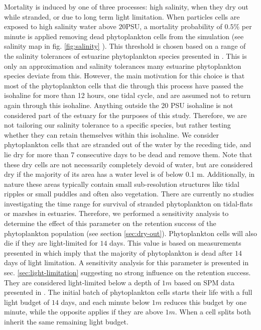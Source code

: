 \documentclass[npg, manuscript]{copernicus}
\begin{document}
Mortality is induced by one of three processes: high salinity, when they dry out while stranded, or due to long term light limitation.
When particles cells are exposed to high salinity water above $20$PSU, a mortality probability of $0.5\%$ per minute is applied removing dead phytoplankton cells from the simulation (see salinity map in fig. \ref{fig:salinity} ).
This threshold is chosen based on a range of the salinity tolerances of estuarine phytoplankton species presented in \citep{vonAlvensleben2016}.
This is only an approximation and salinity tolerances many estuarine phytoplankton species deviate from this.
However, the main motivation for this choice is that most of the phytoplankton cells that die through this process have passed the isohaline for more than 12 hours, one tidal cycle, and are assumed not to return again through this isohaline.
Anything outside the 20 PSU isohaline is not considered part of the estuary for the purposes of this study.
Therefore, we are not tailoring our salinity tolerance to a specific species, but rather testing whether they can retain themselves within this isohaline.
We consider phytoplankton cells that are stranded out of the water by the receding tide, and lie dry for more than $7$ consecutive days to be dead and remove them.
Note that these dry cells are not necessarily completely devoid of water, but are considered dry if the majority of its area has a water level is of below 0.1 \unit{m}.
Additionally, in nature these areas typically contain small sub-resolution structures like tidal ripples or small puddles and often also vegetation.
There are currently no studies investigating the time range for survival of stranded phytoplankton on tidal-flats or marshes in estuaries.
Therefore, we performed a sensitivity analysis to determine the effect of this parameter on the retention success of the phytoplankton population (see section \ref{sec:dry-out}).
Phytoplankton cells will also die if they are light-limited for $14$ days.
This value is based on measurements presented in \citep{Walter2017} which imply that the majority of phytoplankton is dead after $14$ days of light limitation.
A sensitivity analysis for this parameter is presented in sec. \ref{sec:light-limitation} suggesting no strong influence on the retention success.
They are considered light-limited below a depth of $1 \unit{m}$ based on SPM data presented in \citep{Stanev2019}.
The initial batch of phytoplankton cells starts their life with a full light budget of $14$ days, and each minute below $1 \unit{m}$ reduces this budget by one minute, while the opposite applies if they are above $1 \unit{m}$.
When a cell splits both inherit the same remaining light budget.
\end{document}
